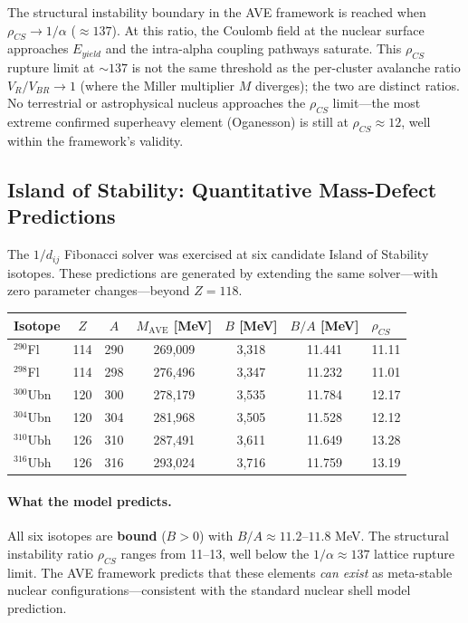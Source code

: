 The structural instability boundary in the AVE framework is reached when $\rho_{CS} \to 1/\alpha$ ($\approx 137$). At this ratio, the Coulomb field at the nuclear surface approaches $E_{yield}$ and the intra-alpha coupling pathways saturate. This $\rho_{CS}$ rupture limit at $\sim 137$ is not the same threshold as the per-cluster avalanche ratio $V_R/V_{BR} \to 1$ (where the Miller multiplier $M$ diverges); the two are distinct ratios. No terrestrial or astrophysical nucleus approaches the $\rho_{CS}$ limit---the most extreme confirmed superheavy element (Oganesson) is still at $\rho_{CS} \approx 12$, well within the framework's validity.

\subsection{Island of Stability: Quantitative Mass-Defect Predictions}
\label{sec:island_stability}

The $1/d_{ij}$ Fibonacci solver was exercised at six candidate Island of Stability isotopes. These predictions are generated by extending the same solver---with zero parameter changes---beyond $Z = 118$.

\begin{center}
\renewcommand{\arraystretch}{1.3}
\begin{tabularx}{\textwidth}{@{}l c c c c c X@{}}
\toprule
\textbf{Isotope} & $Z$ & $A$ & $M_{\text{AVE}}$ [MeV] & $B$ [MeV] & $B/A$ [MeV] & $\rho_{CS}$ \\
\midrule
${}^{290}$Fl & 114 & 290 & 269,009 & 3,318 & 11.441 & 11.11 \\
${}^{298}$Fl & 114 & 298 & 276,496 & 3,347 & 11.232 & 11.01 \\
${}^{300}$Ubn & 120 & 300 & 278,179 & 3,535 & 11.784 & 12.17 \\
${}^{304}$Ubn & 120 & 304 & 281,968 & 3,505 & 11.528 & 12.12 \\
${}^{310}$Ubh & 126 & 310 & 287,491 & 3,611 & 11.649 & 13.28 \\
${}^{316}$Ubh & 126 & 316 & 293,024 & 3,716 & 11.759 & 13.19 \\
\bottomrule
\end{tabularx}
\end{center}

\paragraph{What the model predicts.}
All six isotopes are \textbf{bound} ($B > 0$) with $B/A \approx 11.2$--$11.8$ MeV. The structural instability ratio $\rho_{CS}$ ranges from 11--13, well below the $1/\alpha \approx 137$ lattice rupture limit. The AVE framework predicts that these elements \textit{can exist} as meta-stable nuclear configurations---consistent with the standard nuclear shell model prediction.


